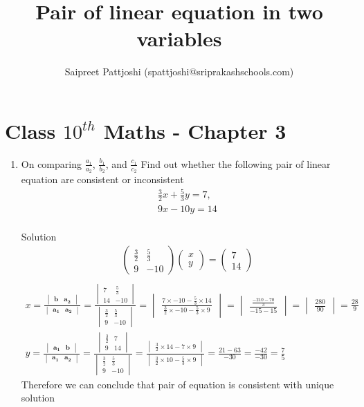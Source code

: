 \documentclass[12pt]{article}
\title{Pair of linear equation in two variables}
\author{Saipreet Pattjoshi (spattjoshi@sriprakashschools.com)}
\newcommand{\myvec}[1]{\ensuremath{\begin{pmatrix}#1\end{pmatrix}}}
\newcommand{\mydet}[1]{\ensuremath{\begin{vmatrix}#1\end{vmatrix}}}
\let\vec\mathbf
\begin{document}
\maketitle
\section*{Class $10^{th}$ Maths - Chapter 3}
\begin{enumerate}
\item On comparing $\frac{a_1}{a_2}$, $\frac{b_1}{b_2}$, and $\frac{c_1}{c_2} $
Find out whether the following pair of linear equation are consistent or inconsistent\\
\begin{align}
 \frac{3}{2}x + \frac{5}{3}y=7,\\
9x-10y=14
 \end{align}
\\
Solution
\begin{align}
 \myvec{ \frac{3}{2} & \frac{5}{3} \\ 9 &-10}
\myvec{x\\y}
=\myvec{7\\14}\\
\end{align}
\begin{align}
x=\frac{\mydet{\vec{b} & \vec{a_2}}}{\mydet{\vec{a_1} & \vec{a_2}}}=\frac{ \mydet{7&\frac{5}{3}\\ 14&-10}}{\mydet{\frac{3}{2}&\frac{5}{3}\\ 9&-10}}
=\mydet{\frac{7\times-10 - \frac{5}{3} \times14}{\frac{3}{2}\times-10-\frac{5}{3}\times9}}
= \mydet{\frac{\frac{-210-70}{3}}{-15-15}}
= \mydet{\frac{280}{90}}
= {\frac{28}{9}}
\\y= \frac{\mydet{\vec{a_1} & \vec{b}}}{\mydet{\vec{a_1}&\vec{a_2}}}
= \frac{\mydet{\frac{3}{2}&7\\9&14}}{\mydet{\frac{3}{2}&\frac{5}{3}\\9&-10}}= \frac{\mydet{\frac{3}{2}\times14 - 7\times9}}{\mydet{\frac{3}{2}\times10 -\frac{5}{3}\times9} }= \frac{21-63}{-30}
= \frac{-42}{-30}= \frac{7}{5}
\end{align}
Therefore we can conclude that pair of equation is consistent with unique solution
\end{enumerate}
\end{document}
